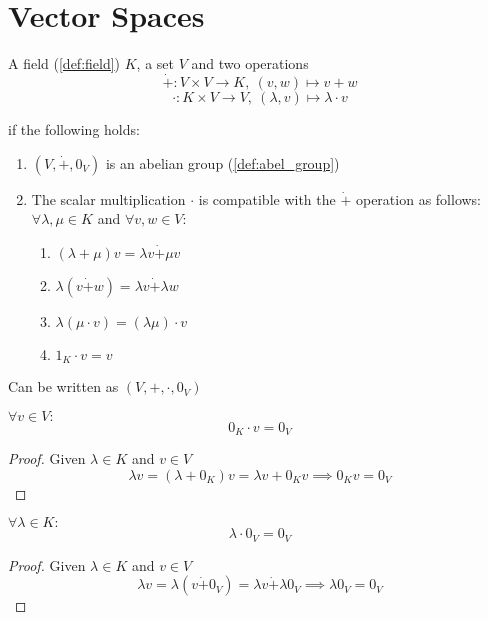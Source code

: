 \section{Vector Spaces}
\begin{definition}\label{def:vector_spaces}
   A field (\ref{def:field}) \(K\), a set \(V\) and two operations
   \[\dot{+}: V \times V \to K,~(v, w) \mapsto v + w\]
   \[\cdot: K \times V \to V,~(\lambda, v) \mapsto \lambda \cdot v\]

   if the following holds:
   \begin{enumerate}[label=(\roman*)]
      \item \((V, \dot{+}, 0_V)\) is an abelian group (\ref{def:abel_group})
      \item The scalar multiplication \(\cdot\) is compatible with the \(\dot{+}\) operation as follows:\\
            \(\forall \lambda, \mu \in K\) and \(\forall v, w \in V\):
         \begin{enumerate}
            \item \((\lambda + \mu) v = \lambda v \dot{+} \mu v\)
            \item \(\lambda (v \dot{+} w) = \lambda v \dot{+} \lambda w\)
            \item \(\lambda (\mu \cdot v) = (\lambda \mu) \cdot v\)
            \item \(1_K \cdot v = v\)
         \end{enumerate}
   \end{enumerate}
   Can be written as \((V, +, \cdot, 0_V)\)
\end{definition}

\begin{proposition}[\(0_K \cdot v = 0_V\)]\label{pro:zero_vector}
   \(\forall v \in V:\)
   \[0_K \cdot v = 0_V\]
\end{proposition}
\begin{proof}
   Given \(\lambda \in K\) and \(v \in V\)
   \[\lambda v = (\lambda + 0_K) v = \lambda v + 0_K v \implies 0_K v = 0_V\]
\end{proof}

\begin{proposition}[\(\lambda 0_V = 0_V\)]
   \(\forall \lambda \in K:\)
   \[\lambda \cdot 0_V = 0_V\]
\end{proposition}
\begin{proof}
   Given \(\lambda \in K\) and \(v \in V\)
   \[\lambda v = \lambda (v \dot{+} 0_V) = \lambda v \dot{+} \lambda 0_V \implies \lambda 0_V = 0_V\]
\end{proof}

